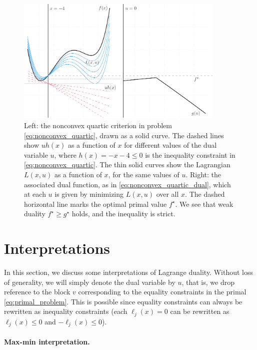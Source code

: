 \begin{figure}[tb]
\centering
\includegraphics[width=0.89\textwidth]{fig/nonconvex_quartic.pdf}
\caption{Left: the nonconvex quartic criterion in problem
  \eqref{eq:nonconvex_quartic}, drawn as a solid curve. The dashed lines show
  $uh(x)$ as a function of $x$ for different values of the dual variable $u$,
  where $h(x) = -x-4 \leq 0$ is the inequality constraint in
  \eqref{eq:nonconvex_quartic}. The thin solid curves show the Lagrangian
  $L(x,u)$ as a function of $x$, for the same values of $u$. Right: the
  associated dual function, as in \eqref{eq:nonconvex_quartic_dual}, which at
  each $u$ is given by minimizing $L(x,u)$ over all $x$. The dashed horizontal
  line marks the optimal primal value $f^\star$. We see that weak duality
  $f^\star \geq g^\star$ holds, and the inequality is strict.}  
\label{fig:nonconvex_quartic}
\end{figure}

\section{Interpretations}
\label{sec:duality_interpretations}

In this section, we discuss some interpretations of Lagrange duality. Without
loss of generality, we will simply denote the dual variable by $u$, that is, we
drop reference to the block $v$ corresponding to the equality constraints in the
primal \eqref{eq:primal_problem}. This is possible since equality constraints
can always be rewritten as inequality constraints (each $\ell_j(x) = 0$ can be
rewritten as $\ell_j(x) \leq 0$ and $-\ell_j(x) \leq 0$). 

\paragraph{Max-min interpretation.}

